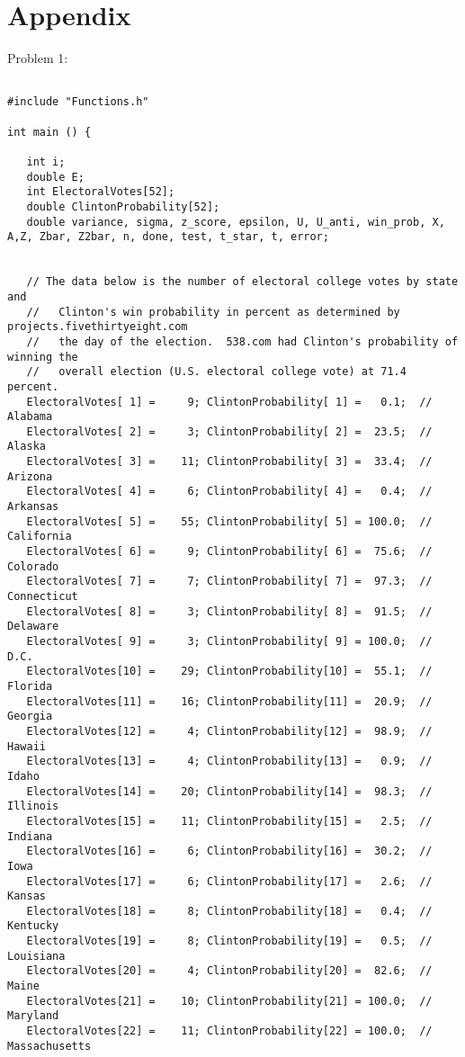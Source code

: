 \documentclass{report}
\begin{document}
\section*{Appendix}
Problem 1:
\begin{lstlisting}

#include "Functions.h"

int main () {

   int i;
   double E;
   int ElectoralVotes[52];
   double ClintonProbability[52];
   double variance, sigma, z_score, epsilon, U, U_anti, win_prob, X, A,Z, Zbar, Z2bar, n, done, test, t_star, t, error; 


   // The data below is the number of electoral college votes by state and
   //   Clinton's win probability in percent as determined by projects.fivethirtyeight.com
   //   the day of the election.  538.com had Clinton's probability of winning the
   //   overall election (U.S. electoral college vote) at 71.4 percent.
   ElectoralVotes[ 1] =     9; ClintonProbability[ 1] =   0.1;  // Alabama
   ElectoralVotes[ 2] =     3; ClintonProbability[ 2] =  23.5;  // Alaska
   ElectoralVotes[ 3] =    11; ClintonProbability[ 3] =  33.4;  // Arizona
   ElectoralVotes[ 4] =     6; ClintonProbability[ 4] =   0.4;  // Arkansas
   ElectoralVotes[ 5] =    55; ClintonProbability[ 5] = 100.0;  // California
   ElectoralVotes[ 6] =     9; ClintonProbability[ 6] =  75.6;  // Colorado
   ElectoralVotes[ 7] =     7; ClintonProbability[ 7] =  97.3;  // Connecticut
   ElectoralVotes[ 8] =     3; ClintonProbability[ 8] =  91.5;  // Delaware
   ElectoralVotes[ 9] =     3; ClintonProbability[ 9] = 100.0;  // D.C.
   ElectoralVotes[10] =    29; ClintonProbability[10] =  55.1;  // Florida
   ElectoralVotes[11] =    16; ClintonProbability[11] =  20.9;  // Georgia
   ElectoralVotes[12] =     4; ClintonProbability[12] =  98.9;  // Hawaii
   ElectoralVotes[13] =     4; ClintonProbability[13] =   0.9;  // Idaho
   ElectoralVotes[14] =    20; ClintonProbability[14] =  98.3;  // Illinois
   ElectoralVotes[15] =    11; ClintonProbability[15] =   2.5;  // Indiana
   ElectoralVotes[16] =     6; ClintonProbability[16] =  30.2;  // Iowa
   ElectoralVotes[17] =     6; ClintonProbability[17] =   2.6;  // Kansas
   ElectoralVotes[18] =     8; ClintonProbability[18] =   0.4;  // Kentucky
   ElectoralVotes[19] =     8; ClintonProbability[19] =   0.5;  // Louisiana
   ElectoralVotes[20] =     4; ClintonProbability[20] =  82.6;  // Maine
   ElectoralVotes[21] =    10; ClintonProbability[21] = 100.0;  // Maryland
   ElectoralVotes[22] =    11; ClintonProbability[22] = 100.0;  // Massachusetts

\end{lstlisting}
\end{document}

